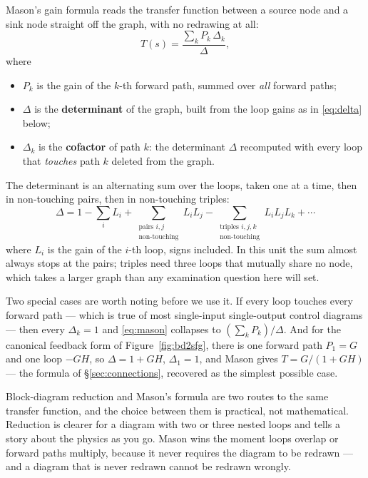 \documentclass[11pt,a4paper]{article}
\begin{document}
Mason's gain formula reads the transfer function between a source node and a
sink node straight off the graph, with no redrawing at all:
\begin{equation}
  T(s) = \frac{\displaystyle\sum_{k} P_k\,\Delta_k}{\Delta} ,
  \label{eq:mason}
\end{equation}
where
\begin{itemize}[leftmargin=*]
\item $P_k$ is the gain of the $k$-th forward path, summed over \emph{all}
      forward paths;
\item $\Delta$ is the \textbf{determinant} of the graph, built from the loop
      gains as in \eqref{eq:delta} below;
\item $\Delta_k$ is the \textbf{cofactor} of path $k$: the determinant
      $\Delta$ recomputed with every loop that \emph{touches} path $k$ deleted
      from the graph.
\end{itemize}

\noindent
The determinant is an alternating sum over the loops, taken one at a time,
then in non-touching pairs, then in non-touching triples:
\begin{equation}
  \Delta = 1
    - \sum_{i} L_i
    + \sum_{\substack{\text{pairs }i,j\\ \text{non-touching}}} L_iL_j
    - \sum_{\substack{\text{triples }i,j,k\\ \text{non-touching}}} L_iL_jL_k
    + \cdots
  \label{eq:delta}
\end{equation}
where $L_i$ is the gain of the $i$-th loop, signs included. In this unit the
sum almost always stops at the pairs; triples need three loops that mutually
share no node, which takes a larger graph than any examination question here
will set.

Two special cases are worth noting before we use it. If every loop touches
every forward path --- which is true of most single-input single-output control
diagrams --- then every $\Delta_k=1$ and \eqref{eq:mason} collapses to
$\left(\sum_k P_k\right)/\Delta$. And for the canonical feedback form of
Figure~\ref{fig:bd2sfg}, there is one forward path $P_1=G$ and one loop
$-GH$, so $\Delta=1+GH$, $\Delta_1=1$, and Mason gives $T=G/(1+GH)$ --- the
formula of \S\ref{sec:connections}, recovered as the simplest possible case.

\begin{keyidea}
Block-diagram reduction and Mason's formula are two routes to the same
transfer function, and the choice between them is practical, not
mathematical. Reduction is clearer for a diagram with two or three nested
loops and tells a story about the physics as you go. Mason wins the moment
loops overlap or forward paths multiply, because it never requires the diagram
to be redrawn --- and a diagram that is never redrawn cannot be redrawn wrongly.
\end{keyidea}
\end{document}

